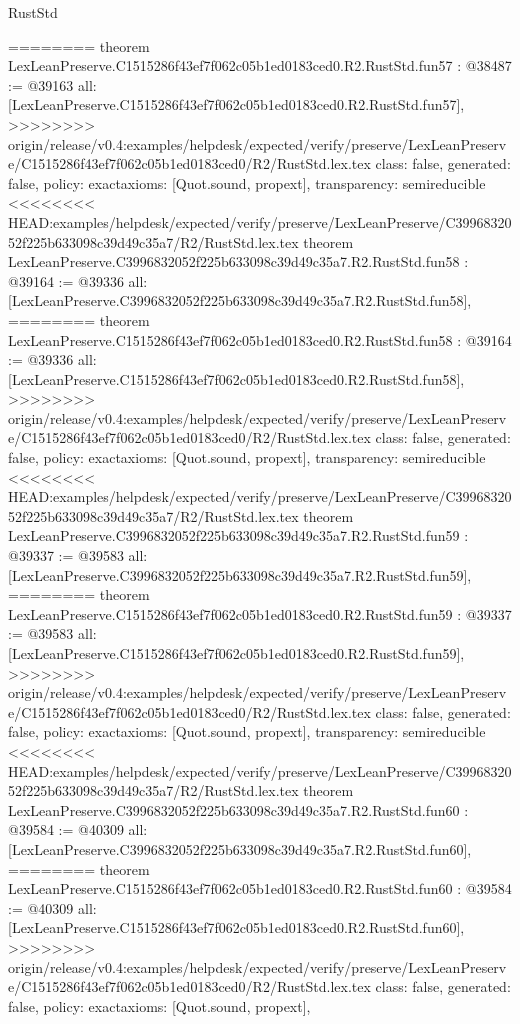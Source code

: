\begin{lexlean}{RustStd}
\begin{coremodule}
{\begin{coremodule}
{{{{{{{{{{{{{{{{{{{{{{{{{{{{{{{{{{{{{{{{{{{{{{{{{{{{{{{{{{{{========
theorem LexLeanPreserve.C1515286f43ef7f062c05b1ed0183ced0.R2.RustStd.fun57 : @38487 := @39163 {
  all: [LexLeanPreserve.C1515286f43ef7f062c05b1ed0183ced0.R2.RustStd.fun57],
>>>>>>>> origin/release/v0.4:examples/helpdesk/expected/verify/preserve/LexLeanPreserve/C1515286f43ef7f062c05b1ed0183ced0/R2/RustStd.lex.tex
  class: false,
  generated: false,
  policy: exact{axioms: [Quot.sound, propext]},
  transparency: semireducible
}
<<<<<<<< HEAD:examples/helpdesk/expected/verify/preserve/LexLeanPreserve/C3996832052f225b633098c39d49c35a7/R2/RustStd.lex.tex
theorem LexLeanPreserve.C3996832052f225b633098c39d49c35a7.R2.RustStd.fun58 : @39164 := @39336 {
  all: [LexLeanPreserve.C3996832052f225b633098c39d49c35a7.R2.RustStd.fun58],
========
theorem LexLeanPreserve.C1515286f43ef7f062c05b1ed0183ced0.R2.RustStd.fun58 : @39164 := @39336 {
  all: [LexLeanPreserve.C1515286f43ef7f062c05b1ed0183ced0.R2.RustStd.fun58],
>>>>>>>> origin/release/v0.4:examples/helpdesk/expected/verify/preserve/LexLeanPreserve/C1515286f43ef7f062c05b1ed0183ced0/R2/RustStd.lex.tex
  class: false,
  generated: false,
  policy: exact{axioms: [Quot.sound, propext]},
  transparency: semireducible
}
<<<<<<<< HEAD:examples/helpdesk/expected/verify/preserve/LexLeanPreserve/C3996832052f225b633098c39d49c35a7/R2/RustStd.lex.tex
theorem LexLeanPreserve.C3996832052f225b633098c39d49c35a7.R2.RustStd.fun59 : @39337 := @39583 {
  all: [LexLeanPreserve.C3996832052f225b633098c39d49c35a7.R2.RustStd.fun59],
========
theorem LexLeanPreserve.C1515286f43ef7f062c05b1ed0183ced0.R2.RustStd.fun59 : @39337 := @39583 {
  all: [LexLeanPreserve.C1515286f43ef7f062c05b1ed0183ced0.R2.RustStd.fun59],
>>>>>>>> origin/release/v0.4:examples/helpdesk/expected/verify/preserve/LexLeanPreserve/C1515286f43ef7f062c05b1ed0183ced0/R2/RustStd.lex.tex
  class: false,
  generated: false,
  policy: exact{axioms: [Quot.sound, propext]},
  transparency: semireducible
}
<<<<<<<< HEAD:examples/helpdesk/expected/verify/preserve/LexLeanPreserve/C3996832052f225b633098c39d49c35a7/R2/RustStd.lex.tex
theorem LexLeanPreserve.C3996832052f225b633098c39d49c35a7.R2.RustStd.fun60 : @39584 := @40309 {
  all: [LexLeanPreserve.C3996832052f225b633098c39d49c35a7.R2.RustStd.fun60],
========
theorem LexLeanPreserve.C1515286f43ef7f062c05b1ed0183ced0.R2.RustStd.fun60 : @39584 := @40309 {
  all: [LexLeanPreserve.C1515286f43ef7f062c05b1ed0183ced0.R2.RustStd.fun60],
>>>>>>>> origin/release/v0.4:examples/helpdesk/expected/verify/preserve/LexLeanPreserve/C1515286f43ef7f062c05b1ed0183ced0/R2/RustStd.lex.tex
  class: false,
  generated: false,
  policy: exact{axioms: [Quot.sound, propext]},
}}}}}}}}}}}}}}}}}}}}}}}}}}}}}}}}}}}}}}}}}}}}}}}}}}}}}}}}}}}}}}}}
\end{coremodule}}
\end{coremodule}
\end{lexlean}
